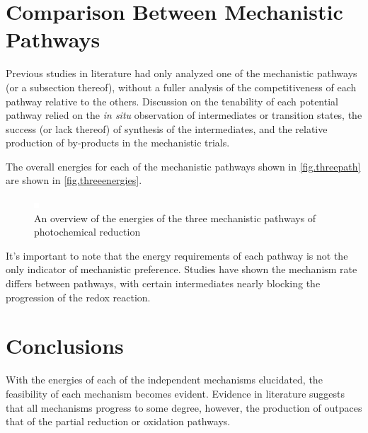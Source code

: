 \section{Comparison Between Mechanistic Pathways} \label{sec.compare}

Previous studies in literature had only analyzed one of the mechanistic pathways (or a subsection thereof), without a fuller analysis of the competitiveness of each pathway relative to the others. Discussion on the tenability of each potential pathway relied on the \textit{in situ} observation of intermediates or transition states, the success (or lack thereof) of synthesis of the intermediates, and the relative production of by-products in the mechanistic trials. 

The overall energies for each of the mechanistic pathways shown in \autoref{fig.threepath} are shown in \autoref{fig.threeenergies}. 

\begin{figure}[!htbp]
 \begin{center}
  \includegraphics[clip=true]{images/insertgraphic.eps}
 \end{center}
\caption[Reaction energies for three mechanistic pathways]{An overview of the energies of the three mechanistic pathways of photochemical  reduction}
\label{fig.threeenergies}
\end{figure} 

It's important to note that the energy requirements of each pathway is not the only indicator of mechanistic preference. Studies have shown the mechanism rate differs between pathways, with certain intermediates nearly blocking the progression of the redox reaction.



\section{Conclusions} 

With the energies of each of the independent mechanisms elucidated, the feasibility of each mechanism becomes evident. Evidence in literature suggests that all mechanisms progress to some degree, however, the production of  outpaces that of the partial reduction or oxidation pathways. 
